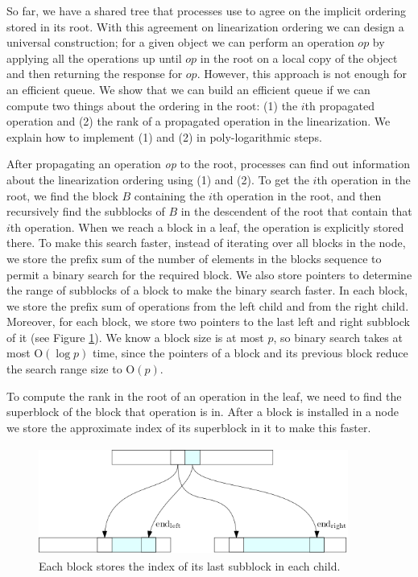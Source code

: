 \documentclass[10pt]{article}
\theoremstyle{definition}
\begin{document}
So far, we have a shared tree that processes use to agree on the implicit ordering stored in its root. With this agreement on linearization ordering we can design a universal construction; for a given object we can perform an operation $op$ by applying all the operations up until $op$ in the root on a local copy of the object and then returning the response for $op$. However, this approach is not enough for an efficient queue.
We show that we can build an efficient queue if we can compute two things about the ordering in the root: (1) the $i$th propagated operation and (2) the rank of a propagated operation in the linearization. We explain how to implement (1) and (2) in poly-logarithmic steps.

After propagating an operation \textit{op} to the root, processes can find out information about the linearization ordering using (1) and (2). 
To get the $i$th operation in the root, we find the block $B$ containing the $i$th operation in the root, and then recursively find the subblocks of $B$ in the descendent of the root that contain that $i$th operation. When we reach a block in a leaf, the operation is explicitly stored there. To make this search faster, instead of iterating over all blocks in the node, we store the prefix sum of the number of elements in the blocks sequence to permit a binary search for the required block. We also store pointers to determine the range of subblocks of a block to make the binary search faster. In each block, we store the prefix sum of operations from the left child and from the right child. Moreover, for each block, we store two pointers to the last left and right subblock of it (see Figure \ref{fig::pointer}). We know a block size is at most $p$, so binary search takes at most \textsc{O}$(\log p)$ time, since the pointers of a block and its previous block reduce the search range size to \textsc{O}$(p)$.

To compute the rank in the root of an operation in the leaf, we need to find the superblock of the block that operation is in. After a block is installed in a node we store the approximate index of its superblock in it to make this faster.

\begin{figure}[hbtp]
\centering
  \includegraphics[width=4in, height=1.4in]{pics/pointers}
  \caption{Each block stores the index of its last subblock in each child. \label{fig::pointer}}
\end{figure}
\end{document}
